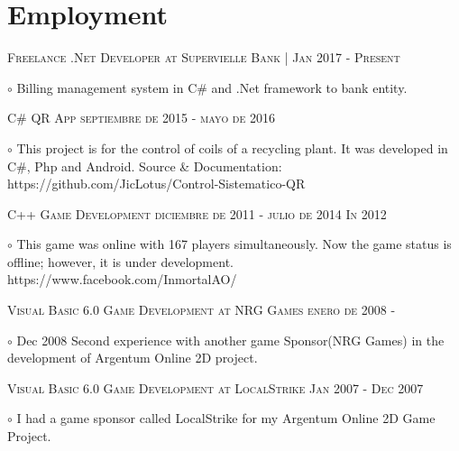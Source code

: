 \documentclass[letterpaper]{article}
\renewenvironment{itemize}{
  \begin{list}{}{
    \setlength{\leftmargin}{1.5em}
  }
}{
  \end{list}
}
\newenvironment{no-indent-itemize}{
  \begin{list}{}{
    \setlength{\leftmargin}{0em}
  }
}{
  \end{list}
}
\def\bullet{$\circ$\xspace}
\begin{document}
\section*{Employment}
\begin{no-indent-itemize}

\item
    \textsc{Freelance .Net Developer at Supervielle Bank | Jan 2017 - Present}
    \begin{itemize}
    \item\bullet Billing management system in C\# and .Net framework to bank entity.
    \end{itemize}
    
\item \textsc{C\# QR App septiembre de 2015 - mayo de 2016}
\begin{itemize} 
\item\bullet 
This project is for the control of coils of a recycling plant. 
It was developed in C\#, Php and Android. 
Source \& Documentation: 
https://github.com/JicLotus/Control-Sistematico-QR
\end{itemize}


\item \textsc{C++ Game Development diciembre de 2011 - julio de 2014 In 2012 }
\begin{itemize} \item\bullet
This game was online with 167 players simultaneously. Now the game status is offline; however, it is under development. https://www.facebook.com/InmortalAO/
\end{itemize}

\item \textsc{Visual Basic 6.0 Game Development at NRG Games enero de 2008 - }
\begin{itemize} \item\bullet
Dec 2008  Second experience with another game Sponsor(NRG Games) in the development of Argentum Online 2D project. 
\end{itemize}


\item \textsc{Visual Basic 6.0 Game Development at LocalStrike Jan 2007 - Dec 2007}
\begin{itemize} \item\bullet
    I had a game sponsor called LocalStrike for my Argentum Online 2D Game Project.
\end{itemize}


\end{no-indent-itemize}
\end{document}
